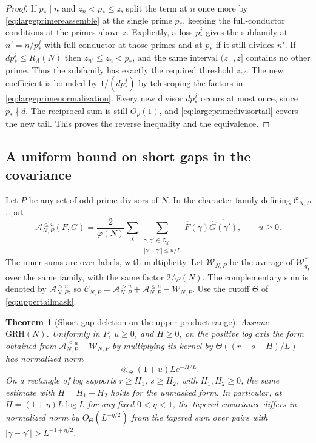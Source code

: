 \documentclass[11pt,a4paper]{article}
\numberwithin{equation}{section}
\newtheorem{theorem}{Theorem}[section]
\newcommand{\grh}{\mathrm{GRH}}
\begin{document}
\begin{proof}
If $p_*\mid n$ and $z_n<p_*\le z$, split the term at
$n$ once more by \cref{eq:largeprimereassemble} at the
single prime $p_*$, keeping the full-conductor conditions
at the primes above $z$. Explicitly, a loss $p_*^j$
gives the subfamily at $n'=n/p_*^j$ with full conductor
at those primes and at $p_*$ if it still divides $n'$.
If $dp_*^j\le R_A(N)$ then $z_{n'}\le z_n<p_*$,
and the same interval $(z_-,z]$ contains no other prime.
Thus the subfamily has exactly the required threshold
$z_{n'}$. The new coefficient is bounded by $1/(dp_*^j)$
by telescoping the factors in \cref{eq:largeprimenormalization}.
Every new divisor $dp_*^j$ occurs at most once, since
$p_*\nmid d$. The reciprocal sum is still $O_\rho(1)$,
and \cref{eq:largeprimedivisortail} covers the new tail.
This proves the reverse inequality and the equivalence.
\end{proof}

\subsection{A uniform bound on short gaps in the covariance}

Let $P$ be any set of odd prime divisors of $N$. In the
character family defining $\mathcal C_{N,P}$, put
\[
 \mathcal A_{N,P}^{\le u}(F,G)
   =\frac2{\varphi(N)}
      \sum_{\chi}
      \sum_{\substack{\gamma,\gamma'\in\mathcal Z_\chi\\
                         |\gamma-\gamma'|\le u/L}}
        \widehat F(\gamma)\overline{\widehat G(\gamma')},
       \qquad u\ge0.
\]
The inner sums are over labels, with multiplicity.
Let $\mathcal W_{N,P}$ be the average of $\mathcal W_{q_\chi}^{*}$
over the same family, with the same factor $2/\varphi(N)$.
The complementary sum is denoted by $\mathcal A_{N,P}^{>u}$,
so $\mathcal C_{N,P}=\mathcal A_{N,P}^{>u}
                     +\mathcal A_{N,P}^{\le u}-\mathcal W_{N,P}$.
Use the cutoff $\Theta$ of \cref{eq:uppertailmask}.

\begin{theorem}[Short-gap deletion on the upper product range]
\label{thm:shortgapdeletion}
Assume $\grh(N)$. Uniformly in $P$, $u\ge0$, and $H\ge0$,
on the positive log axis the form obtained from
$\mathcal A_{N,P}^{\le u}-\mathcal W_{N,P}$ by multiplying
its kernel by $\Theta((r+s-H)/L)$ has normalized norm
\begin{equation}
     \ll_{\Theta} (1+u)L e^{-H/L}.
 \label{eq:shortgapupper}
\end{equation}
On a rectangle of log supports $r\ge H_1$, $s\ge H_2$,
with $H_1,H_2\ge0$, the same estimate with $H=H_1+H_2$
holds for the unmasked form. In particular, at
$H=(1+\eta)L\log L$ for any fixed $0<\eta<1$, the tapered
covariance differs in normalized norm by $O_\Theta(L^{-\eta/2})$
from the tapered sum over pairs with
$|\gamma-\gamma'|>L^{-1+\eta/2}$.
\end{theorem}
\end{document}
